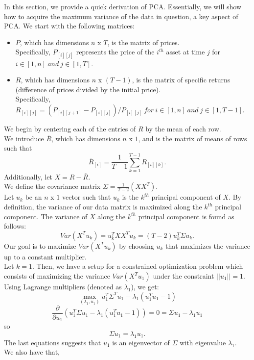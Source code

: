 \documentclass{article}
\begin{document}
In this section, we provide a quick derivation of PCA. Essentially, we will show how to acquire the maximum variance of the data in question, a key aspect of PCA. We start with the following matrices:\\
\begin{itemize}
\item $P$, which has dimensions $n$ x $T$, is the matrix of prices.\\
Specifically, $P_{[i][j]}$ represents the price of the $i^{th}$ asset at time $j$ for $i\in[1,n]\ and\ j\in[1,T]$.\\
\item $R$, which has dimensions $n$ x $(T-1)$, is the matrix of specific returns (difference of prices divided by the initial price).\\
Specifically, $R_{[i][j]} = (P_{[i][j+1]} - P_{[i][j]})/P_{[i][j]}\ for \ i\in[1,n]\ and\ j\in[1,T-1]$.\\
\end{itemize}
We begin by centering each of the entries of $R$ by the mean of each row.\\ We introduce
$\overline{R}$, which has dimensions $n$ x $1$, and is the matrix of means of rows such that 
$$\overline{R}_{[i]} = \frac{1}{T-1} \sum_{k=1}^{T-1} R_{[i][k]}.$$
Additionally, let $X = R - \overline{R}$.\\
We define the covariance matrix $\Sigma = \frac{1}{T-2}(XX^T)$.\\
Let $u_k$ be an $n$ x $1$ vector such that $u_k$ is the $k^{th}$ principal component of $X$. By definition, the variance of our data matrix is maximized along the $k^{th}$ principal component. The variance of $X$ along the $k^{th}$ principal component is found as follows:
$$Var(X^{T}u_k) = u_{k}^{T}XX^{T}u_k = (T-2)u_{k}^{T}\Sigma u_k.$$
Our goal is to maximize $Var(X^{T}u_k)$ by choosing $u_k$ that maximizes the variance up to a constant multiplier.\\
Let $k=1$. Then, we have a setup for a constrained optimization problem which consists of maximizing the variance $Var(X^{T}u_1)$ under the constraint $\vert\vert u_{1} \vert\vert = 1$. Using Lagrange multipliers (denoted as $\lambda_{1}$), we get:\\
$$\max_{(\lambda_{1},u_{1})}u_{1}^{T}\Sigma^{T}u_{1}-\lambda_{1}(u_{1}^{T}u_{1}-1)$$
$$\frac{\partial}{\partial u_1}(u_{1}^{T}\Sigma u_1-\lambda_{1}(u_{1}^{T}u_{1}-1))=0=\Sigma u_1 - \lambda_1 u_1 $$ so
$$\Sigma u_1 = \lambda_{1}u_1 .$$
The last equations suggests that 
$u_1$ is an eigenvector of $\Sigma$ with eigenvalue $\lambda_1$.\\ We also have that, 
\end{document}
